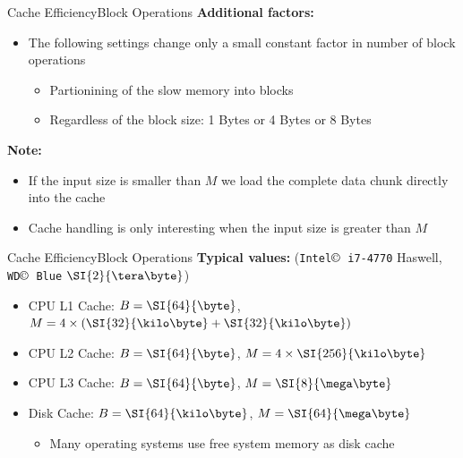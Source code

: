 \begin{frame}{Cache Efficiency}{Block Operations}
  \textbf{Additional factors:}\\
  \begin{itemize}
    \item<2->
    The following settings change only a small constant factor in number of block operations
    \begin{itemize}
    \item<3-> Partionining of the slow memory into blocks
    \item<4-> Regardless of the block size: {\color{MainA}1 Bytes} or
      {\color{MainA}4 Bytes} or {\color{MainA}8 Bytes}
    \end{itemize}
  \end{itemize}
  \vspace{1.0em}
  \textbf{Note:}\\
  \begin{itemize}
    \item<6->
      If the {\color{MainA}input size} is
      {\color{MainA}smaller than $M$} we load the complete data chunk
      directly into the cache
    \item<7->
      Cache handling is only interesting when the
      {\color{MainA}input size} is
      {\color{MainA}greater than $M$}
  \end{itemize}
\end{frame}


\begin{frame}{Cache Efficiency}{Block Operations}
  \textbf{Typical values:}
  (\texttt{Intel$\copyright$ i7-4770} Haswell,
  \texttt{WD$\copyright$ Blue} $\SI{2}{\tera\byte}$)
  \begin{itemize}
    \item<2->
      CPU L1 Cache: {\color{MainA}$B = \SI{64}{\byte}$},
      {\color{MainA}$M = 4 \times (\SI{32}{\kilo\byte} + \SI{32}{\kilo\byte})$}
    \item<3->
      CPU L2 Cache: {\color{MainA}$B = \SI{64}{\byte}$}, {\color{MainA}$M = 4 \times \SI{256}{\kilo\byte}$}
    \item<4->
      CPU L3 Cache: {\color{MainA}$B = \SI{64}{\byte}$}, {\color{MainA}$M = \SI{8}{\mega\byte}$}
    \item<4->
      Disk Cache: {\color{MainA}$B = \SI{64}{\kilo\byte}$}, {\color{MainA}$M = \SI{64}{\mega\byte}$}
    \begin{itemize}
      \item<5->
        Many operating systems use free system memory as disk cache
    \end{itemize}
  \end{itemize}
\end{frame}


